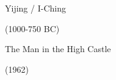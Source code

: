 \documentclass{beamer}
\begin{document}
\begin{frame}[c]
	\centering
	\Huge
	Yijing / I-Ching
	
	(1000-750 BC)
\end{frame}
  
  
  \begin{frame}[plain]
  \end{frame}
  \begin{frame}[c]
  	\centering
  	\Huge
  	The Man in the High Castle
  	
  	(1962)
  \end{frame}

\end{document}
